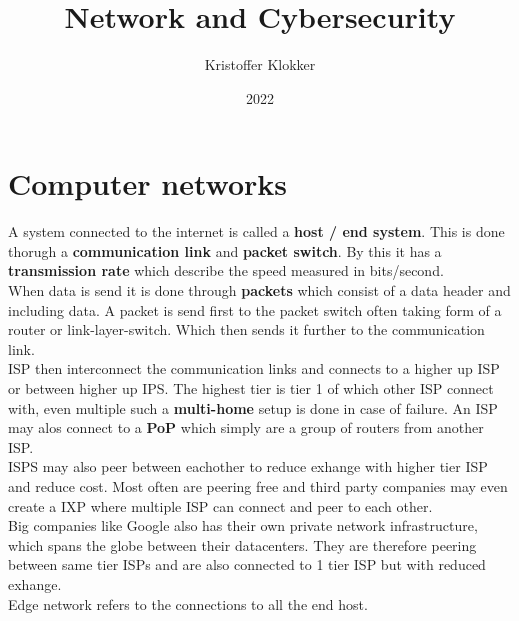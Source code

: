 \documentclass[12pt, a4paper]{article}
\title{Network and Cybersecurity}
\date{2022}
\author{Kristoffer Klokker}
\begin{document}
	\maketitle
	\clearpage
	\tableofcontents
	\clearpage
	\section{Computer networks}
		A system connected to the internet is called a \textbf{host / end system}. This is done thorugh a \textbf{communication link} and \textbf{packet switch}. By this it has a \textbf{transmission rate} which describe the speed measured in bits/second.\\
		When data is send it is done through \textbf{packets} which consist of a data header and including data. A packet is send first to the packet switch often taking form of a router or link-layer-switch. Which then sends it further to the communication link.\\
		ISP then interconnect the communication links and connects to a higher up ISP or between higher up IPS. The highest tier is tier 1 of which other ISP connect with, even multiple such a \textbf{multi-home} setup is done in case of failure. An ISP may alos connect to a \textbf{PoP} which simply are a group of routers from another ISP.\\
		ISPS may also peer between eachother to reduce exhange with higher tier ISP and reduce cost. Most often are peering free and third party companies may even create a IXP where multiple ISP can connect and peer to each other.\\
		Big companies like Google also has their own private network infrastructure, which spans the globe between their datacenters. They are therefore peering between same tier ISPs and are also connected to 1 tier ISP but with reduced exhange.\\
		Edge network refers to the connections to all the end host.
\end{document}
